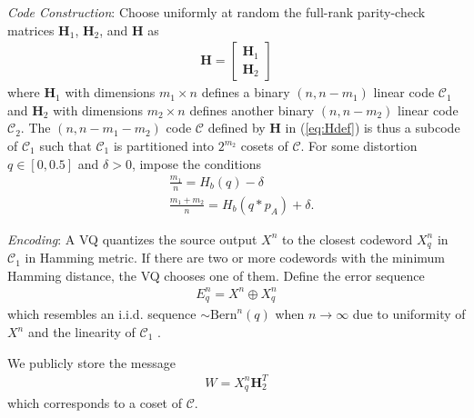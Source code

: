 \documentclass[journal,10pt,twoside]{IEEEtran}
\newcommand*\xor{\mathbin{\oplus}}
\begin{document}
\emph{Code Construction}: Choose uniformly at random the full-rank parity-check matrices $\mathbf{H}_1$, $\mathbf{H}_2$, and $\mathbf{H}$ as
\begin{align}
\mathbf{H} = \begin{bmatrix}
\mathbf{H}_1\\[0.3em]
\mathbf{H}_2
\end{bmatrix}\label{eq:Hdef}
\end{align}
where $\mathbf{H}_1$ with dimensions $m_1\times n$ defines a binary $(n,n-m_1)$ linear code $\mathcal{C}_1$ and $\mathbf{H}_2$ with dimensions $m_2\times n$ defines another binary $(n,n\!-\!m_2)$ linear code $\mathcal{C}_2$. The $(n,n\!-\!m_1\!-\!m_2)$ code $\mathcal{C}$ defined by $\mathbf{H}$ in (\ref{eq:Hdef}) is thus a subcode of $\mathcal{C}_1$ such that $\mathcal{C}_1$ is partitioned into $2^{m_2}$ cosets of $\mathcal{C}$. For some distortion $q\in[0,0.5]$ and $\delta>0$, impose the conditions
\begin{align}
&\frac{m_1}{n} = H_b(q)-\delta\label{eq:constraintonm1}\\ 
&\frac{m_1+m_2}{n} = H_b(q*p_A)+\delta\label{eq:constraintonm2}.
\end{align}   

\emph{Encoding}: A VQ quantizes the source output $X^n$ to the closest codeword $X_{q}^n$ in $\mathcal{C}_1$ in Hamming metric. If there are two or more codewords with the minimum Hamming distance, the VQ chooses one of them. Define the error sequence 
\begin{align}
E_{q}^n = X^n\xor X_{q}^n \label{eq:minhammdist}
\end{align}
which resembles an i.i.d. sequence $\sim\text{Bern}^n(q)$ when $n\rightarrow \infty$ due to uniformity of $X^n$ and the linearity of $\mathcal{C}_1$ \cite{lossysourcecoding}. 

We publicly store the message 
\begin{align}
W = X_{q}^{n}\mathbf{H}_2^T\label{eq:whattostore}
\end{align}
which corresponds to a coset of $\mathcal{C}$. 
\end{document}
